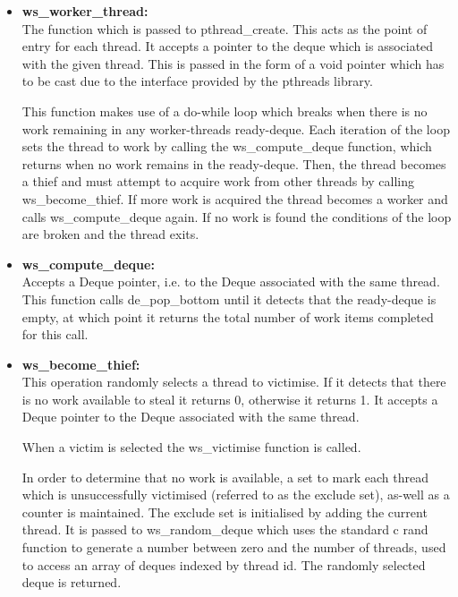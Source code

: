 
\begin{itemize}
\item \textbf{ws\_worker\_thread: } \\
                The function which is passed to pthread\_create. This acts as the point of entry for each thread.
                It accepts a pointer to the deque which is associated with the given thread. This is passed 
                in the form of a void pointer which has to be cast due to the interface provided by the pthreads
                library.
              
                This function makes use of a do-while loop which breaks when there is no work remaining in any worker-threads ready-deque. 
                Each iteration of the loop sets the thread to work by calling the ws\_compute\_deque function, which returns when 
                no work remains in the ready-deque. Then, the thread becomes a thief and must attempt to acquire work
                from other threads by calling ws\_become\_thief. If more work is acquired the thread becomes a worker and calls ws\_compute\_deque
                again. If no work is found the conditions of the loop are broken and the thread exits.
              
\item \textbf{ws\_compute\_deque: } \\
                Accepts a Deque pointer, i.e. to the Deque associated with the same thread. This function 
                calls de\_pop\_bottom until it detects that the ready-deque is empty, at which point it returns
                the total number of work items completed for this call.
                
\item \textbf{ws\_become\_thief: } \\
                This operation randomly selects a thread to victimise. If it detects that there is no work
                available to steal it returns 0, otherwise it returns 1.
                It accepts a Deque pointer to the Deque associated with the same thread. 
                
                When a victim is selected the ws\_victimise function is called.
                
                In order to determine that no work is available, a set to mark each thread which is unsuccessfully victimised (referred to as
                the exclude set), as-well as a counter is maintained.
                The exclude set is initialised by adding the current thread. It is passed to ws\_random\_deque which
                uses the standard c rand function to generate a number between zero and the number of threads, used to access an array 
                of deques indexed by thread id. The randomly selected deque is returned.
                

\end{itemize}
